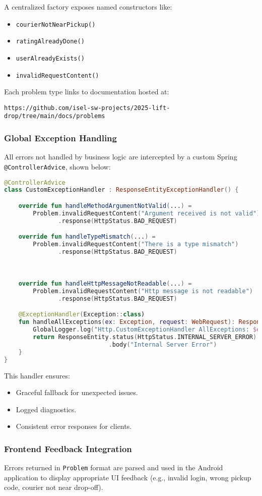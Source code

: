 A centralized factory exposes named constructors like:
\begin{itemize}
  \item \texttt{courierNotNearPickup()}
  \item \texttt{ratingAlreadyDone()}
  \item \texttt{userAlreadyExists()}
  \item \texttt{invalidRequestContent()}
\end{itemize}

Each problem type links to documentation hosted at:

\texttt{https://github.com/isel-sw-projects/2025-lift-drop/tree/main/docs/problems}

\subsubsection{Global Exception Handling}

All errors not handled by business logic are intercepted by a custom Spring \texttt{@ControllerAdvice}, shown below:

\begin{lstlisting}[language=Kotlin, caption={Global Exception Handler}]
@ControllerAdvice
class CustomExceptionHandler : ResponseEntityExceptionHandler() {

    override fun handleMethodArgumentNotValid(...) =
        Problem.invalidRequestContent("Argument received is not valid")
               .response(HttpStatus.BAD_REQUEST)

    override fun handleTypeMismatch(...) =
        Problem.invalidRequestContent("There is a type mismatch")
               .response(HttpStatus.BAD_REQUEST)


    
    override fun handleHttpMessageNotReadable(...) =
        Problem.invalidRequestContent("Http message is not readable")
               .response(HttpStatus.BAD_REQUEST)

    @ExceptionHandler(Exception::class)
    fun handleAllExceptions(ex: Exception, request: WebRequest): ResponseEntity<String> {
        GlobalLogger.log("Http.CustomExceptionHandler AllExceptions: $ex")
        return ResponseEntity.status(HttpStatus.INTERNAL_SERVER_ERROR)
                             .body("Internal Server Error")
    }
}
\end{lstlisting}

This handler ensures:
\begin{itemize}
    \item Graceful fallback for unexpected issues.
    \item Logged diagnostics.
    \item Consistent error responses for clients.
\end{itemize}

\subsubsection{Frontend Feedback Integration}

Errors returned in \texttt{Problem} format are parsed and used in the Android application to display appropriate UI feedback (e.g., invalid login, wrong pickup code, courier not near drop-off).

